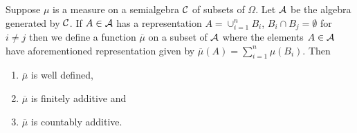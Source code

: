 \begin{theorem}
    Suppose $\mu$ is a measure on a semialgebra ${\cal C}$ of subsets of $\Omega$. Let ${\cal A}$ be the algebra generated by ${\cal C}$. If $A\in {\cal A}$ has a representation $A=\cup_{i=1}^{n} B_i$, $B_i \cap B_j = \emptyset$ for $i\ne j$ then we define a function $\overline \mu $ on a subset of ${\cal A}$ where the elements $A\in {\cal A}$ have aforementioned representation given by $\overline{\mu} (A) = \sum_{i=1}^{n} \mu (B_i)$. Then
    \begin{enumerate}
	\item $\overline \mu$ is well defined,
	\item $\overline \mu$ is finitely additive and
	\item $\overline \mu$ is countably additive.
    \end{enumerate}
    \label{thm:extension-semialgebra-algebra}
\end{theorem}
